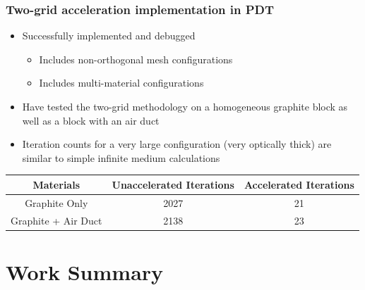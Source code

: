 \documentclass[compress,10pt]{beamer}
\begin{document}
\begin{frame}[t]\frametitle{Two-grid acceleration implementation in PDT}
\begin{block}{}
\begin{itemize}
	\item Successfully implemented and debugged
	\begin{itemize}
		\item Includes non-orthogonal  mesh configurations
		\item Includes multi-material configurations
	\end{itemize}
	\item Have tested the two-grid methodology on a homogeneous graphite block as well as a block with an air duct
	\item Iteration counts for a very large configuration (very optically thick) are similar to simple infinite medium calculations
\end{itemize}
\end{block}
\centering
\vspace{1cm}
\begin{table}
\footnotesize
\begin{tabular}{|c|c|c|}
\hline
Materials & Unaccelerated Iterations & Accelerated Iterations  \\
\hline \hline
Graphite Only & 2027 & 21 \\ \hline
Graphite + Air Duct & 2138 & 23 \\ \hline
\end{tabular}
\end{table}
\end{frame}
\typeout{***********************************************************************************}

\section{Work Summary}
\subsection{}
\end{document}
